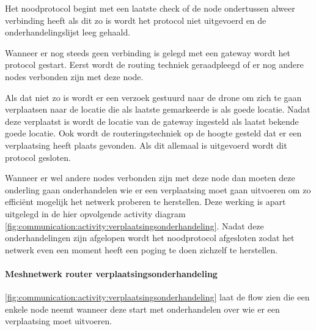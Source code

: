 \documentclass[a4paper, 11pt, oneside]{report}
\begin{document}
Het noodprotocol begint met een laatste check of de node ondertussen alweer verbinding heeft 
als dit zo is wordt het protocol niet uitgevoerd en de onderhandelingslijst leeg gehaald.

Wanneer er nog steeds geen verbinding is gelegd met een gateway wordt het protocol gestart.
Eerst wordt de routing techniek geraadpleegd of er nog andere nodes verbonden zijn met deze node.

Als dat niet zo is wordt er een verzoek gestuurd naar de drone om zich te gaan verplaatsen naar de locatie die als laatste gemarkeerde is als goede locatie.
Nadat deze verplaatst is wordt de locatie van de gateway ingesteld als laatst bekende goede locatie.
Ook wordt de routeringstechniek op de hoogte gesteld dat er een verplaatsing heeft plaats gevonden.
Als dit allemaal is uitgevoerd wordt dit protocol gesloten.

Wanneer er wel andere nodes verbonden zijn met deze node dan moeten deze onderling gaan onderhandelen wie er een verplaatsing moet gaan uitvoeren om zo efficiënt mogelijk het netwerk proberen te herstellen. Deze werking is apart uitgelegd in de hier opvolgende activity diagram \ref{fig:communication:activity:verplaatsingsonderhandeling}. Nadat deze onderhandelingen zijn afgelopen wordt het noodprotocol afgesloten zodat het netwerk even een moment heeft een poging te doen zichzelf te herstellen.
\pagebreak
\paragraph{Meshnetwerk router verplaatsingsonderhandeling}
\autoref{fig:communication:activity:verplaatsingsonderhandeling} laat de flow zien die een enkele node neemt wanneer deze start met onderhandelen over wie er een verplaatsing moet uitvoeren.
\end{document}
